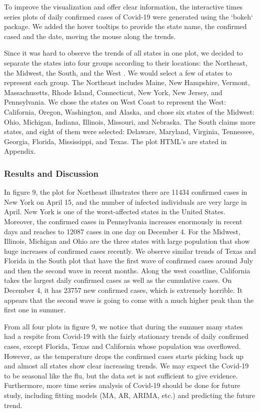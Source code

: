 \documentclass{article}
\begin{document}
To improve the visualization and offer clear information, the interactive times series plots of daily confirmed cases of Covid-19 were generated using the `bokeh` package. We added the hover tooltips to provide the state name, the confirmed cased and the date, moving the mouse along the trends.


Since it was hard to observe the trends of all states in one plot, we decided to separate the states into four groups according to their locations: the Northeast, the Midwest, the South, and the West \cite{USregion}. We would select a few of states to represent each group. The Northeast includes Maine, New Hampshire, Vermont, Massachusetts, Rhode Island, Connecticut, New York, New Jersey, and Pennsylvania. We chose the states on West Coast to represent the West: California, Oregon, Washington, and Alaska, and chose six states of the Midwest: Ohio, Michigan, Indiana, Illinois, Missouri, and Nebraska. The South claims more states, and eight of them were selected: Delaware, Maryland, Virginia, Tennessee, Georgia, Florida, Mississippi, and Texas. The plot HTML's are stated in Appendix.



\subsubsection{Results and Discussion}


In figure 9, the plot for Northeast illustrates there are 11434 confirmed cases in New York on April 15, and the number of infected individuals are very large in April. New York is one of the worst-affected states in the United States. Moreover, the confirmed cases in Pennsylvania increases enormously in recent days and reaches to 12087 cases in one day on December 4. For the Midwest, Illinois, Michigan and Ohio are the three states with large population that show huge increases of confirmed cases recently. We observe similar trends of Texas and Florida in the South plot that have the first wave of confirmed cases around July and then the second wave in recent months. Along the west coastline, California takes the largest daily confirmed cases as well as the cumulative cases. On December 4, it has 23757 new confirmed cases, which is extremely horrible. It appears that the second wave is going to come with a much higher peak than the first one in summer.


From all four plots in figure 9, we notice that during the summer many states had a respite from Covid-19 with the fairly stationary trends of daily confirmed cases, except Florida, Texas and California whose population was overflowed. However, as the temperature drops the confirmed cases starts picking back up and almost all states show clear increasing trends. We may expect the Covid-19 to be seasonal like the flu, but the data set is not sufficient to give evidence. Furthermore, more time series analysis of Covid-19 should be done for future study, including fitting models (MA, AR, ARIMA, etc.) and predicting the future trend.
\end{document}
